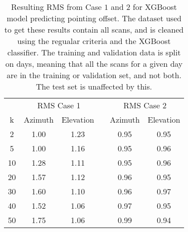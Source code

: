 \begin{table}[h]
    \centering %
    \caption{Resulting RMS from Case $1$ and $2$ for XGBoost model predicting pointing offset.
    The dataset used to get these results contain all scans, and is cleaned using the regualar criteria and the XGBoost classifier.
    The training and validation data is split on days, meaning that all the scans for a given day
    are in the training or validation set, and not both. The test set is unaffected by this.}
    \begin{tabular}{ccc c cc}
        \toprule
        \multicolumn{1}{c}{} & \multicolumn{2}{c}{RMS Case 1} & & \multicolumn{2}{c}{RMS Case 2} \\
        \cmidrule(lr){2-3} \cmidrule(lr){5-6}
         k & Azimuth & Elevation & & Azimuth & Elevation \\
        \midrule
         2 &  1.00 & 1.23 & & 0.95 &  0.95 \\
         5 &  1.00 & 1.16 & & 0.95 &  0.96 \\
        10 &  1.28 & 1.11 & & 0.95 &  0.96 \\
        20 &  1.57 & 1.12 & & 0.96 &  0.95 \\
        30 &  1.60 & 1.10 & & 0.96 &  0.97 \\
        40 &  1.52 & 1.06 & & 0.97 &  0.95 \\
        50 &  1.75 & 1.06 & & 0.99 &  0.94 \\
        \bottomrule
    \end{tabular}
\end{table}


